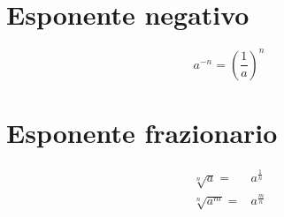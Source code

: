 \section{Esponente negativo}
\begin{equation}
a^{-n}=\left(\dfrac{1}{a}\right)^n
\end{equation}
\section{Esponente frazionario}
\begin{align}
\sqrt[n]{a}=&a^{\frac{1}{n}}\\
\sqrt[n]{a^m}=&a^{\frac{m}{n}}
\end{align}
